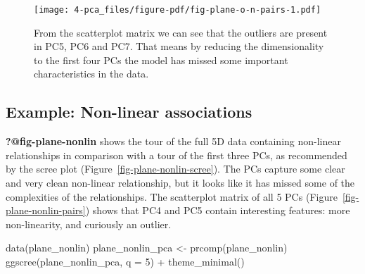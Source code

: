 \documentclass[
  letterpaper,
]{krantz}
\newenvironment{Shaded}{\begin{snugshade}}{\end{snugshade}}
\newcommand{\AttributeTok}[1]{\textcolor[rgb]{0.40,0.45,0.13}{#1}}
\newcommand{\DecValTok}[1]{\textcolor[rgb]{0.68,0.00,0.00}{#1}}
\newcommand{\FunctionTok}[1]{\textcolor[rgb]{0.28,0.35,0.67}{#1}}
\newcommand{\NormalTok}[1]{\textcolor[rgb]{0.00,0.23,0.31}{#1}}
\newcommand{\OtherTok}[1]{\textcolor[rgb]{0.00,0.23,0.31}{#1}}
\newcommand{\SpecialCharTok}[1]{\textcolor[rgb]{0.37,0.37,0.37}{#1}}
\begin{document}
\begin{Shaded}
\end{Shaded}

\begin{figure}[H]

{\centering \texttt{[image: 4-pca\_files/figure-pdf/fig-plane-o-n-pairs-1.pdf]}

}

\caption{\label{fig-plane-o-n-pairs}From the scatterplot matrix we can
see that the outliers are present in PC5, PC6 and PC7. That means by
reducing the dimensionality to the first four PCs the model has missed
some important characteristics in the data.}

\end{figure}

\hypertarget{example-non-linear-associations}{%
\subsection{Example: Non-linear
associations}\label{example-non-linear-associations}}

\textbf{?@fig-plane-nonlin} shows the tour of the full 5D data
containing non-linear relationships in comparison with a tour of the
first three PCs, as recommended by the scree plot
(Figure~\ref{fig-plane-nonlin-scree}). The PCs capture some clear and
very clean non-linear relationship, but it looks like it has missed some
of the complexities of the relationships. The scatterplot matrix of all
5 PCs (Figure~\ref{fig-plane-nonlin-pairs}) shows that PC4 and PC5
contain interesting features: more non-linearity, and curiously an
outlier.

\begin{Shaded}
\begin{Highlighting}[]
\FunctionTok{data}\NormalTok{(plane\_nonlin)}
\NormalTok{plane\_nonlin\_pca }\OtherTok{\textless{}{-}} \FunctionTok{prcomp}\NormalTok{(plane\_nonlin)}
\FunctionTok{ggscree}\NormalTok{(plane\_nonlin\_pca, }\AttributeTok{q =} \DecValTok{5}\NormalTok{) }\SpecialCharTok{+} \FunctionTok{theme\_minimal}\NormalTok{()}
\end{Highlighting}
\end{Shaded}
\end{document}
